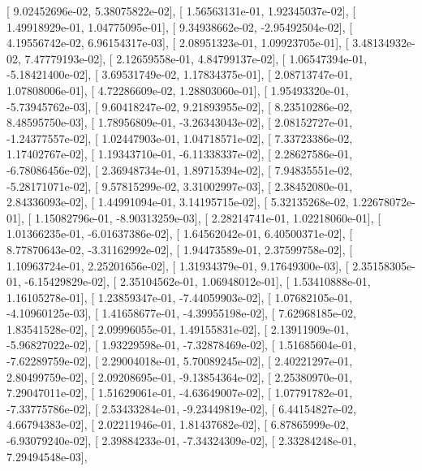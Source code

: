 \documentclass{article}
\begin{document}
       [  9.02452696e-02,   5.38075822e-02],
       [  1.56563131e-01,   1.92345037e-02],
       [  1.49918929e-01,   1.04775095e-01],
       [  9.34938662e-02,  -2.95492504e-02],
       [  4.19556742e-02,   6.96154317e-03],
       [  2.08951323e-01,   1.09923705e-01],
       [  3.48134932e-02,   7.47779193e-02],
       [  2.12659558e-01,   4.84799137e-02],
       [  1.06547394e-01,  -5.18421400e-02],
       [  3.69531749e-02,   1.17834375e-01],
       [  2.08713747e-01,   1.07808006e-01],
       [  4.72286609e-02,   1.28803060e-01],
       [  1.95493320e-01,  -5.73945762e-03],
       [  9.60418247e-02,   9.21893955e-02],
       [  8.23510286e-02,   8.48595750e-03],
       [  1.78956809e-01,  -3.26343043e-02],
       [  2.08152727e-01,  -1.24377557e-02],
       [  1.02447903e-01,   1.04718571e-02],
       [  7.33723386e-02,   1.17402767e-02],
       [  1.19343710e-01,  -6.11338337e-02],
       [  2.28627586e-01,  -6.78086456e-02],
       [  2.36948734e-01,   1.89715394e-02],
       [  7.94835551e-02,  -5.28171071e-02],
       [  9.57815299e-02,   3.31002997e-03],
       [  2.38452080e-01,   2.84336093e-02],
       [  1.44991094e-01,   3.14195715e-02],
       [  5.32135268e-02,   1.22678072e-01],
       [  1.15082796e-01,  -8.90313259e-03],
       [  2.28214741e-01,   1.02218060e-01],
       [  1.01366235e-01,  -6.01637386e-02],
       [  1.64562042e-01,   6.40500371e-02],
       [  8.77870643e-02,  -3.31162992e-02],
       [  1.94473589e-01,   2.37599758e-02],
       [  1.10963724e-01,   2.25201656e-02],
       [  1.31934379e-01,   9.17649300e-03],
       [  2.35158305e-01,  -6.15429829e-02],
       [  2.35104562e-01,   1.06948012e-01],
       [  1.53410888e-01,   1.16105278e-01],
       [  1.23859347e-01,  -7.44059903e-02],
       [  1.07682105e-01,  -4.10960125e-03],
       [  1.41658677e-01,  -4.39955198e-02],
       [  7.62968185e-02,   1.83541528e-02],
       [  2.09996055e-01,   1.49155831e-02],
       [  2.13911909e-01,  -5.96827022e-02],
       [  1.93229598e-01,  -7.32878469e-02],
       [  1.51685604e-01,  -7.62289759e-02],
       [  2.29004018e-01,   5.70089245e-02],
       [  2.40221297e-01,   2.80499759e-02],
       [  2.09208695e-01,  -9.13854364e-02],
       [  2.25380970e-01,   7.29047011e-02],
       [  1.51629061e-01,  -4.63649007e-02],
       [  1.07791782e-01,  -7.33775786e-02],
       [  2.53433284e-01,  -9.23449819e-02],
       [  6.44154827e-02,   4.66794383e-02],
       [  2.02211946e-01,   1.81437682e-02],
       [  6.87865999e-02,  -6.93079240e-02],
       [  2.39884233e-01,  -7.34324309e-02],
       [  2.33284248e-01,   7.29494548e-03],
\end{document}
